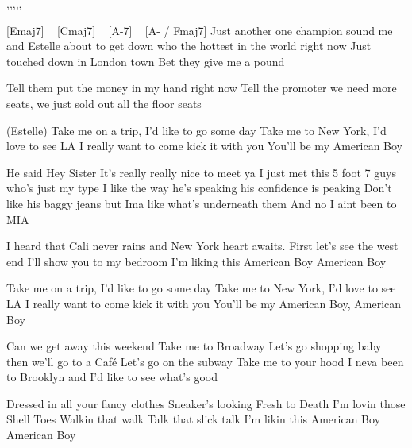 
\begin{tabline}{1}{}{}{,,,,,}



\end{tabline}

\begin{guitar}

[Emaj7] ~ [Cmaj7] ~ [A-7] ~ [A- / Fmaj7]
 Just another one champion sound
me and Estelle about to get down
who the hottest in the world right now
Just touched down in London town
Bet they give me a pound

Tell them put the money in my hand right now
Tell the promoter we need more seats,
we just sold out all the floor seats

(Estelle)
Take me on a trip, I'd like to go some day
Take me to New York, I'd love to see LA
I really want to come kick it with you
You'll be my American Boy

He said Hey Sister
It's really really nice to meet ya
I just met this 5 foot 7 guys who's just my type
I like the way he's speaking his confidence is peaking
Don't like his baggy jeans but Ima like what's underneath them
And no I aint been to MIA

I heard that Cali never rains and New York heart awaits. First let's see the west end
I'll show you to my bedroom
I'm liking this American Boy
American Boy

Take me on a trip, I'd like to go some day
Take me to New York, I'd love to see LA
I really want to come kick it with you
You'll be my American Boy, American Boy

Can we get away this weekend
Take me to Broadway
Let's go shopping baby then we'll go to a Café
Let's go on the subway
Take me to your hood
I neva been to Brooklyn and I'd like to see what's good

Dressed in all your fancy clothes
Sneaker's looking Fresh to Death I'm lovin those Shell Toes
Walkin that walk
Talk that slick talk
I'm likin this American Boy
American Boy


\end{guitar}
